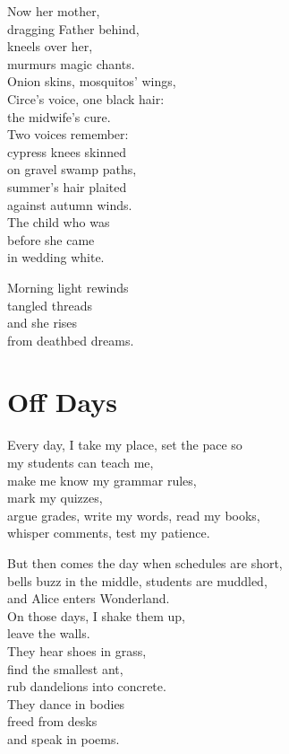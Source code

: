 \documentclass[twoside,10pt]{book}
\begin{document}
Now her mother,\\
dragging Father behind,\\
kneels over her,\\
murmurs magic chants.\\
Onion skins, mosquitos' wings,\\
Circe's voice, one black hair:\\
the midwife's cure.\\
Two voices remember:\\
cypress knees skinned\\
on gravel swamp paths,\\
summer's hair plaited\\
against autumn winds.\\
The child who was\\
before she came\\
in wedding white.

Morning light rewinds\\
tangled threads\\
and she rises\\
from deathbed dreams.


\clearpage
\section{Off Days}

Every day, I take my place, set the pace so\\
my students can teach me,\\
make me know my grammar rules,\\
mark my quizzes,\\
argue grades, write my words, read my books,\\
whisper comments, test my patience.

But then comes the day when schedules are short,\\
bells buzz in the middle, students are muddled,\\
and Alice enters Wonderland.\\
On those days, I shake them up,\\
leave the walls.\\
They hear shoes in grass,\\
find the smallest ant,\\
rub dandelions into concrete.\\
They dance in bodies\\
freed from desks\\
and speak in poems.
\end{document}
